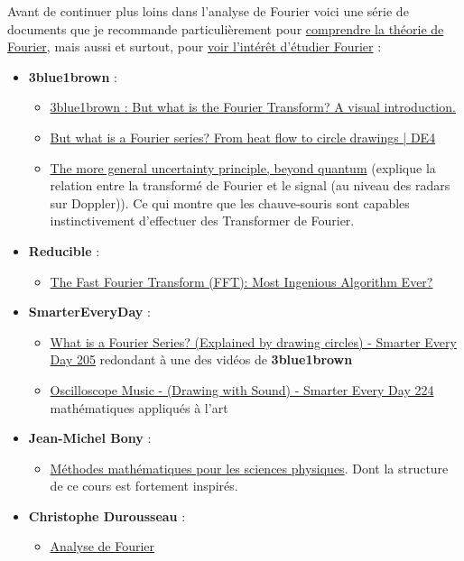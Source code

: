 \documentclass[a4paper]{book}
\begin{document}
Avant de continuer plus loins dans l'analyse de Fourier voici une série de
documents que je recommande particulièrement pour \underline{comprendre la
théorie de Fourier}, mais aussi et surtout, pour \underline{voir l'intérêt
d'étudier Fourier} :
\begin{itemize}
	\item \textbf{3blue1brown} :
		\begin{itemize}
			\item \href{https://www.youtube.com/watch?v=spUNpyF58BY}
				{3blue1brown : But what is the Fourier Transform? 
				A visual introduction.}
			\item \href{https://www.youtube.com/watch?v=r6sGWTCMz2k}{But
				what is a Fourier series? From heat flow to
				circle drawings | DE4}
			\item \href{https://www.youtube.com/watch?v=MBnnXbOM5S4}{The
				more general uncertainty principle, beyond
				quantum} (explique la relation entre la
				transformé de Fourier et le signal (au niveau
				des radars sur Doppler)). Ce qui montre que les
				chauve-souris sont capables instinctivement
				d'effectuer des Transformer de Fourier.
		\end{itemize}
	\item \textbf{Reducible} :
		\begin{itemize}
			\item \href{https://www.youtube.com/watch?v=h7apO7q16V0}{The
				Fast Fourier Transform (FFT): Most Ingenious
				Algorithm Ever?}
		\end{itemize}
	\item \textbf{SmarterEveryDay} :
		\begin{itemize}
			\item \href{https://www.youtube.com/watch?v=ds0cmAV-Yek}{
					What is a Fourier Series? (Explained by
					drawing circles) - Smarter Every Day
					205} redondant à une des vidéos de
					\textbf{3blue1brown} 
			\item \href{https://www.youtube.com/watch?v=4gibcRfp4zA}{
					Oscilloscope Music - (Drawing with
					Sound) - Smarter Every Day 224} 
					mathématiques appliqués à l'art
		\end{itemize}
	\item \textbf{Jean-Michel Bony} :
		\begin{itemize}
			\item \underline{Méthodes mathématiques pour les sciences
				physiques}. Dont la structure de ce cours est
				fortement inspirés.
		\end{itemize}
	\item \textbf{Christophe Durousseau} :
		\begin{itemize}
			\item \underline{Analyse de Fourier}
		\end{itemize}
\end{itemize}
\end{document}
